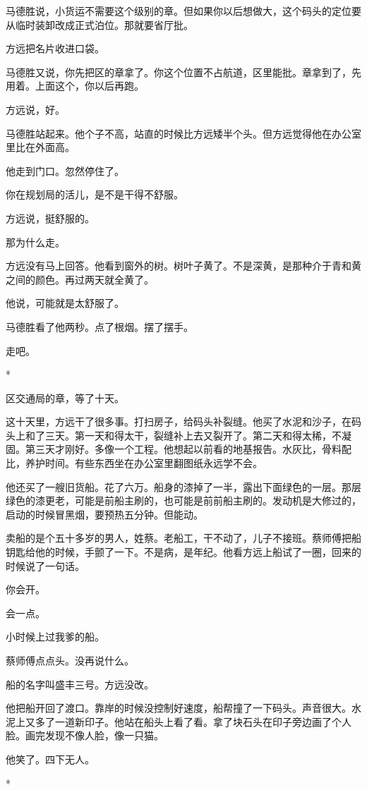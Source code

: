 \documentclass[UTF8,a5paper,11pt,openany]{ctexbook}
\newcommand{\scene}{\vspace{1em}\begin{center}*\quad*\quad*\end{center}\vspace{0.5em}}
\begin{document}
马德胜说，小货运不需要这个级别的章。但如果你以后想做大，这个码头的定位要从临时装卸改成正式泊位。那就要省厅批。

方远把名片收进口袋。

马德胜又说，你先把区的章拿了。你这个位置不占航道，区里能批。章拿到了，先用着。上面这个，你以后再跑。

方远说，好。

马德胜站起来。他个子不高，站直的时候比方远矮半个头。但方远觉得他在办公室里比在外面高。

他走到门口。忽然停住了。

你在规划局的活儿，是不是干得不舒服。

方远说，挺舒服的。

那为什么走。

方远没有马上回答。他看到窗外的树。树叶子黄了。不是深黄，是那种介于青和黄之间的颜色。再过两天就全黄了。

他说，可能就是太舒服了。

马德胜看了他两秒。点了根烟。摆了摆手。

走吧。


\scene

区交通局的章，等了十天。

这十天里，方远干了很多事。打扫房子，给码头补裂缝。他买了水泥和沙子，在码头上和了三天。第一天和得太干，裂缝补上去又裂开了。第二天和得太稀，不凝固。第三天才刚好。多像一个工程。他想起以前看的地基报告。水灰比，骨料配比，养护时间。有些东西坐在办公室里翻图纸永远学不会。

他还买了一艘旧货船。花了六万。船身的漆掉了一半，露出下面绿色的一层。那层绿色的漆更老，可能是前船主刷的，也可能是前前船主刷的。发动机是大修过的，启动的时候冒黑烟，要预热五分钟。但能动。

卖船的是个五十多岁的男人，姓蔡。老船工，干不动了，儿子不接班。蔡师傅把船钥匙给他的时候，手颤了一下。不是病，是年纪。他看方远上船试了一圈，回来的时候说了一句话。

你会开。

会一点。

小时候上过我爹的船。

蔡师傅点点头。没再说什么。

船的名字叫盛丰三号。方远没改。

他把船开回了渡口。靠岸的时候没控制好速度，船帮撞了一下码头。声音很大。水泥上又多了一道新印子。他站在船头上看了看。拿了块石头在印子旁边画了个人脸。画完发现不像人脸，像一只猫。

他笑了。四下无人。


\scene
\end{document}
